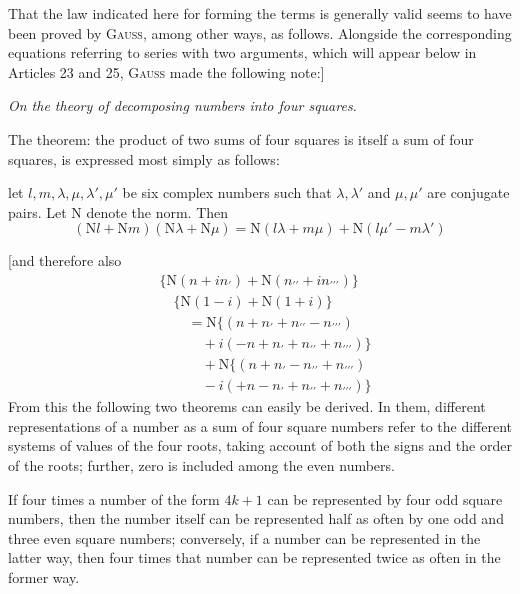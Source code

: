 %
That the law indicated here for forming the terms is generally valid seems to have been proved by \textsc{Gauss}, among other ways, as follows. Alongside the corresponding equations referring to series with two arguments, which will appear below in Articles 23 and 25, \textsc{Gauss} made the following note:]

\begingroup\itshape
On the theory of decomposing numbers into four squares.

The theorem: the product of two sums of four squares is itself a sum of four squares, is expressed most simply as follows:

let $l,m,\lambda,\mu,\lambda',\mu'$ be six complex numbers such that $\lambda,\lambda'$ and $\mu,\mu'$ are conjugate pairs.
Let $\mathrm N$ denote the norm. Then
\[
(\mathrm Nl+\mathrm Nm)(\mathrm N\lambda+\mathrm N\mu)
=\mathrm N(l\lambda+m\mu)+\mathrm N(l\mu'-m\lambda')
\]
\par\endgroup
{}
[and therefore also
\[
\begin{aligned}
&\{\mathrm N(n+in_{\prime})+\mathrm N(n_{\prime\prime}+in_{\prime\prime\prime})\}
\\&\quad\{\mathrm N(1-i)+\mathrm N(1+i)\}\\
&\qquad=\mathrm N\{(n+n_{\prime}+n_{\prime\prime}-n_{\prime\prime\prime})
\\&\qquad\quad+i(-n+n_{\prime}+n_{\prime\prime}+n_{\prime\prime\prime})\}\\
&\qquad\quad+\mathrm N\{(n+n_{\prime}-n_{\prime\prime}+n_{\prime\prime\prime})
\\&\qquad\quad-i(+n-n_{\prime}+n_{\prime\prime}+n_{\prime\prime\prime})\}
\end{aligned}
\]
From this the following two theorems can easily be derived. In them, different representations of a number as a sum of four square numbers refer to the different systems of values of the four roots, taking account of both the signs and the order of the roots; further, zero is included among the even numbers.

If four times a number of the form $4k+1$ can be represented by four odd square numbers, then the number itself can be represented half as often by one odd and three even square numbers; conversely, if a number can be represented in the latter way, then four times that number can be represented twice as often in the former way.

